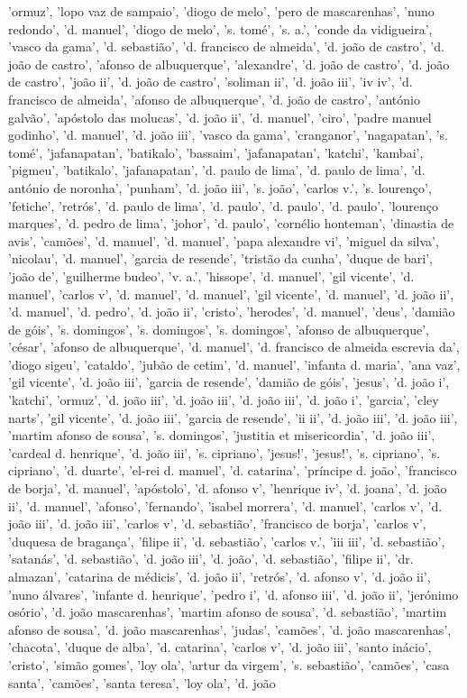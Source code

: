 \documentclass{article}
\begin{document}
\begin{itemize}
'ormuz', 'lopo vaz de sampaio', 'diogo de melo', 'pero de mascarenhas', 'nuno redondo', 'd. manuel', 'diogo de melo', 's. tomé', 's. a.', 'conde da vidigueira', 'vasco da gama', 'd. sebastião', 'd. francisco de almeida', 'd. joão de castro', 'd. joão de castro', 'afonso de albuquerque', 'alexandre', 'd. joão de castro', 'd. joão de castro', 'joão ii', 'd. joão de castro', 'soliman ii', 'd. joão iii', 'iv iv', 'd. francisco de almeida', 'afonso de albuquerque', 'd. joão de castro', 'antónio galvão', 'apóstolo das molucas', 'd. joão ii', 'd. manuel', 'ciro', 'padre manuel godinho', 'd. manuel', 'd. joão iii', 'vasco da gama', 'cranganor', 'nagapatan', 's. tomé', 'jafanapatan', 'batikalo', 'bassaim', 'jafanapatan', 'katchi', 'kambai', 'pigmeu', 'batikalo', 'jafanapatan', 'd. paulo de lima', 'd. paulo de lima', 'd. antónio de noronha', 'punham', 'd. joão iii', 's. joão', 'carlos v.', 's. lourenço', 'fetiche', 'retrós', 'd. paulo de lima', 'd. paulo', 'd. paulo', 'd. paulo', 'lourenço marques', 'd. pedro de lima', 'johor', 'd. paulo', 'cornélio honteman', 'dinastia de avis', 'camões', 'd. manuel', 'd. manuel', 'papa alexandre vi', 'miguel da silva', 'nicolau', 'd. manuel', 'garcia de resende', 'tristão da cunha', 'duque de bari', 'joão de', 'guilherme budeo', 'v. a.', 'hissope', 'd. manuel', 'gil vicente', 'd. manuel', 'carlos v', 'd. manuel', 'd. manuel', 'gil vicente', 'd. manuel', 'd. joão ii', 'd. manuel', 'd. pedro', 'd. joão ii', 'cristo', 'herodes', 'd. manuel', 'deus', 'damião de góis', 's. domingos', 's. domingos', 's. domingos', 'afonso de albuquerque', 'césar', 'afonso de albuquerque', 'd. manuel', 'd. francisco de almeida escrevia da', 'diogo sigeu', 'cataldo', 'jubão de cetim', 'd. manuel', 'infanta d. maria', 'ana vaz', 'gil vicente', 'd. joão iii', 'garcia de resende', 'damião de góis', 'jesus', 'd. joão i', 'katchi', 'ormuz', 'd. joão iii', 'd. joão iii', 'd. joão iii', 'd. joão i', 'garcia', 'cley narts', 'gil vicente', 'd. joão iii', 'garcia de resende', 'ii ii', 'd. joão iii', 'd. joão iii', 'martim afonso de sousa', 's. domingos', 'justitia et misericordia', 'd. joão iii', 'cardeal d. henrique', 'd. joão iii', 's. cipriano', 'jesus!', 'jesus!', 's. cipriano', 's. cipriano', 'd. duarte', 'el-rei d. manuel', 'd. catarina', 'príncipe d. joão', 'francisco de borja', 'd. manuel', 'apóstolo', 'd. afonso v', 'henrique iv', 'd. joana', 'd. joão ii', 'd. manuel', 'afonso', 'fernando', 'isabel morrera', 'd. manuel', 'carlos v', 'd. joão iii', 'd. joão iii', 'carlos v', 'd. sebastião', 'francisco de borja', 'carlos v', 'duquesa de bragança', 'filipe ii', 'd. sebastião', 'carlos v.', 'iii iii', 'd. sebastião', 'satanás', 'd. sebastião', 'd. joão iii', 'd. joão', 'd. sebastião', 'filipe ii', 'dr. almazan', 'catarina de médicis', 'd. joão ii', 'retrós', 'd. afonso v', 'd. joão ii', 'nuno álvares', 'infante d. henrique', 'pedro i', 'd. afonso iii', 'd. joão ii', 'jerónimo osório', 'd. joão mascarenhas', 'martim afonso de sousa', 'd. sebastião', 'martim afonso de sousa', 'd. joão mascarenhas', 'judas', 'camões', 'd. joão mascarenhas', 'chacota', 'duque de alba', 'd. catarina', 'carlos v', 'd. joão iii', 'santo inácio', 'cristo', 'simão gomes', 'loy ola', 'artur da virgem', 's. sebastião', 'camões', 'casa santa', 'camões', 'santa teresa', 'loy ola', 'd. joão 
\end{itemize}
\end{document}
